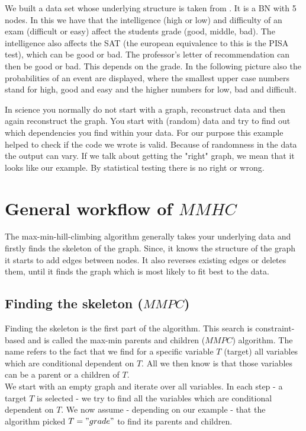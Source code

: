 		We built a data set whose underlying structure is taken from \cite{KoFr}. It is a BN with 5 nodes. In this we have that the intelligence (high or low) and difficulty of an exam (difficult or easy) affect the students grade (good, middle, bad). The intelligence also affects the SAT (the european equivalence to this is the PISA test), which can be good or bad. The professor's letter of recommendation can then be good or bad. This depends on the grade. In the following picture also the probabilities of an event are displayed, where the smallest upper case numbers stand for high, good and easy and the higher numbers for low, bad and difficult.

		 \label{img.exampleGraph}

		In science you normally do not start with a graph, reconstruct data and then again reconstruct the graph. You start with (random) data and try to find out which dependencies you find within your data. For our purpose this example helped to check if the code we wrote is valid. Because of randomness in the data the output can vary. If we talk about getting the "right" graph, we mean that it looks like our example. By statistical testing there is no right or wrong.

	\section{General workflow of $MMHC$}

		The max-min-hill-climbing algorithm generally takes your underlying data and firstly finds the skeleton of the graph. Since, it knows the structure of the graph it starts to add edges between nodes. It also reverses existing edges or deletes them, until it finds the graph which is most likely to fit best to the data.

		\subsection*{Finding the skeleton ($MMPC$)}

			Finding the skeleton is the first part of the algorithm. This search is constraint-based and is called the max-min parents and children ($MMPC$) algorithm. The name refers to the fact that we find for a specific variable $T$ (target) all variables which are conditional dependent on $T$. All we then know is that those variables can be a parent or a children of $T$.\\
			We start with an empty graph and iterate over all variables. In each step - a target $T$ is selected - we try to find all the variables which are conditional dependent on $T$. We now assume - depending on our example - that the algorithm picked $T = "grade"$ to find its parents and children.

